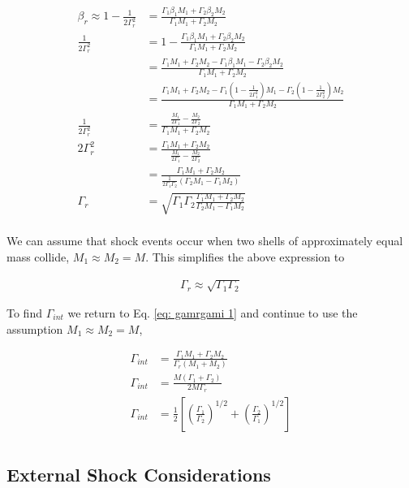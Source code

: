 \documentclass[linenumbers,twocolumn]{aastex631}
\begin{document}
\begin{appendix}
\begin{align}
	\beta_r \approx 1-\frac{1}{2\Gamma_r^2} &= \frac{\Gamma_1\beta_1M_1+\Gamma_2\beta_2M_2}{\Gamma_1M_1 + \Gamma_2M_2} \\
	\frac{1}{2\Gamma_r^2} &= 1 - \frac{\Gamma_1\beta_1M_1+\Gamma_2\beta_2M_2}{\Gamma_1M_1 + \Gamma_2M_2} \\ 
	&= \frac{\Gamma_1M_1 + \Gamma_2M_2 - \Gamma_1\beta_1M_1 - \Gamma_2\beta_2M_2 }{\Gamma_1M_1 + \Gamma_2M_2} \\
	&= \frac{\Gamma_1M_1 + \Gamma_2M_2 - \Gamma_1(1-\frac{1}{2\Gamma_1^2})M_1 - \Gamma_2(1-\frac{1}{2\Gamma_2^2})M_2 }{\Gamma_1M_1 + \Gamma_2M_2} \\
	\frac{1}{2\Gamma_r^2} &= \frac{\frac{M_1}{2\Gamma_1} - \frac{M_2}{2\Gamma_2}}{\Gamma_1M_1 + \Gamma_2M_2} \\
	2\Gamma_r^2 &= \frac{\Gamma_1M_1 + \Gamma_2M_2}{\frac{M_1}{2\Gamma_1} - \frac{M_2}{2\Gamma_2}} \\
	&= \frac{\Gamma_1M_1 + \Gamma_2M_2}{\frac{1}{2\Gamma_1\Gamma_2}(\Gamma_2M_1 - \Gamma_1M_2)} \\
	\Gamma_r &= \sqrt{\Gamma_1\Gamma_2\frac{\Gamma_1M_1 + \Gamma_2M_2}{\Gamma_2M_1 - \Gamma_1M_2}} \\
\end{align}

We can assume that shock events occur when two shells of approximately equal mass collide, $M_1 \approx M_2 = M$. This simplifies the above expression to

\begin{align}
	\Gamma_r \approx \sqrt{\Gamma_1\Gamma_2}
\end{align}

To find $\Gamma_{int}$ we return to Eq. \ref{eq: gamrgami 1} and continue to use the assumption $M_1 \approx M_2 = M$, 

\begin{align}
	\Gamma_{int} &= \frac{\Gamma_1M_1 + \Gamma_2M_2}{\Gamma_r(M_1+M_2)}\\
	\Gamma_{int} &= \frac{M(\Gamma_1 + \Gamma_2)}{2M\Gamma_r}\\
	\Gamma_{int} &= \frac{1}{2}\left[ \left(\frac{\Gamma_1}{\Gamma_2}\right)^{1/2} + \left(\frac{\Gamma_2}{\Gamma_1}\right)^{1/2}\right]\\
\end{align}

\subsection{External Shock Considerations}


\end{appendix}
\end{document}
